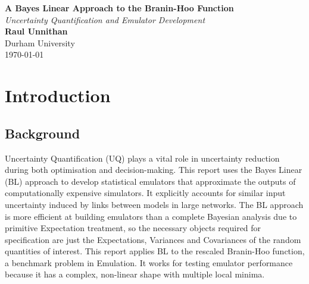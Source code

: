 \documentclass[12pt]{report} %
\begin{document}
\begin{titlepage}
    \centering
    {\Huge \textbf{A Bayes Linear Approach to the Branin-Hoo Function}}\\
    \vspace{1cm}
    {\Large \textit{Uncertainty Quantification and Emulator Development}}\\
    \vspace{2cm}
    {\Large \textbf{Raul Unnithan}}\\
    \vfill
    {\large Durham University}\\
    \vspace{1cm}
    {\large \today}
\end{titlepage}

\tableofcontents

\chapter{Introduction}
\section{Background}
Uncertainty Quantification (UQ) plays a vital role in uncertainty reduction during both optimisation and decision-making.\cite{abdar2021review} This report uses the Bayes Linear (BL) approach to develop statistical emulators that approximate the outputs of computationally expensive simulators. It explicitly accounts for similar input uncertainty induced by links between models in large networks.\cite{jackson2019bl} The BL approach is more efficient at building emulators than a complete Bayesian analysis due to primitive Expectation treatment, so the necessary objects required for specification are just the Expectations, Variances and Covariances of the random quantities of interest.\cite{vernon2024}
This report applies BL to the rescaled Branin-Hoo function, a benchmark problem in Emulation. It works for testing emulator performance because it has a complex, non-linear shape with multiple local minima.\cite{surjanovic2013branin} 
\end{document}
